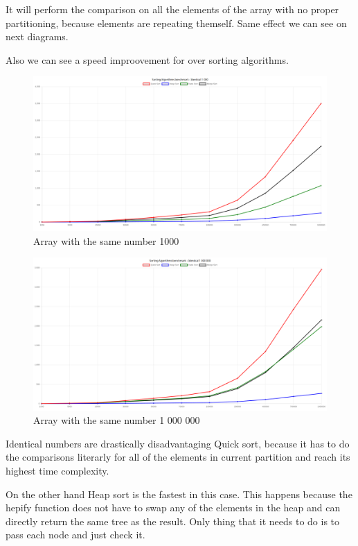 \documentclass[12pt]{article}
\begin{document}
It will perform the comparison on all the elements of the array with no proper partitioning, because elements are repeating themself. Same effect we can see on next diagrams.

Also we can see a speed improovement for over sorting algorithms.


\begin{figure}[h]
    \centering
    \includegraphics[width=1\textwidth]{iden1000.png}
    \caption{Array with the same number 1000}
    \label{fig:identical1000}
\end{figure}

\begin{figure}[h]
    \centering
    \includegraphics[width=1\textwidth]{iden1000000.png}
    \caption{Array with the same number 1 000 000}
    \label{fig:identical1000000}
\end{figure}

\clearpage
Identical numbers are drastically disadvantaging Quick sort, because it has to 
do the comparisons literarly for all of the elements in current partition and reach its highest 
time complexity. 

On the other hand Heap sort is the fastest in this case. This happens because the hepify function does not 
have to swap any of the elements in the heap and can directly return the same 
tree as the result. Only thing that it needs to do is to pass each node and just check it.
\end{document}

